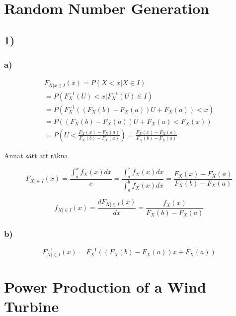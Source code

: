 \documentclass[a4paper]{article}
\begin{document}
 
\section*{Random Number Generation}

\subsection*{1)}

\subsubsection*{a)}

\begin{equation}
     \begin{gathered}
        F_{X|x\in{I}}(x) = P(X < x | X \in I) \\
        = P(F_X^{-1}(U) < x | F_X^{-1}(U) \in I) \\
        = P(F_X^{-1}((F_X(b)-F_X(a))U+F_X(a)) < x) \\
        = P((F_X(b)-F_X(a))U + F_X(a) < F_X(x)) \\
        = P(U < \frac{F_X(x)-F_X(a)}{F_X(b)-F_X(a)})
        = \frac{F_X(x)-F_X(a)}{F_X(b)-F_X(a)}
     \end{gathered}
\end{equation}

Annat sätt att räkna

\begin{equation}
    F_{X|\in{I}}(x) = \frac{\int_a^xf_X(x)dx}{c} = \frac{\int_a^xf_X(x)dx}{\int_a^bf_X(x)dx} = \frac{F_X(x)-F_X(a)}{F_X(b)-F_X(a)}
\end{equation}

\begin{equation}
    f_{X|\in{I}}(x) = \frac{dF_{X|\in{I}}(x)}{dx} = \frac{f_X(x)}{F_X(b)-F_X(a)}
\end{equation}

\subsubsection*{b)}

\begin{equation}
    F_{X|\in{I}}^{-1}(x) = F_X^{-1}((F_X(b)- F_X(a))x + F_X(a))
\end{equation}
\newpage
\section*{Power Production of a Wind Turbine}
\end{document}

